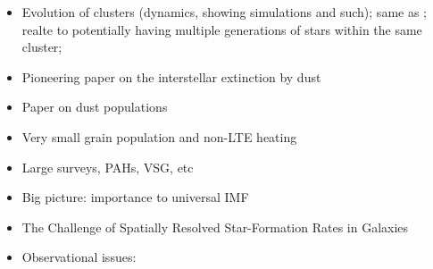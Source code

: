 \begin{itemize}
\item \citep{Bate:2003cv} Evolution of clusters (dynamics, showing simulations and such); same as \citep{Bonnell:2003iw}; realte to potentially having multiple generations of stars within the same cluster; \citep{Allen:2007wqa}
\item \citep{Mathis:1990jk} Pioneering paper on the interstellar extinction by dust
\item \citep{Weingartner:2001du} Paper on dust populations
\item \citep{Li:2001gk} Very small grain population and non-LTE heating
\item \citep{Compiegne:2010kk} Large surveys, PAHs, VSG, etc
\item \citep{Bastian:2010ig} Big picture: importance to universal IMF
\item \citep{Kennicutt:2012ey} The Challenge of Spatially Resolved Star-Formation Rates in Galaxies
\item \citep{Hennebelle:2012dk} Observational issues: 

\end{itemize}



